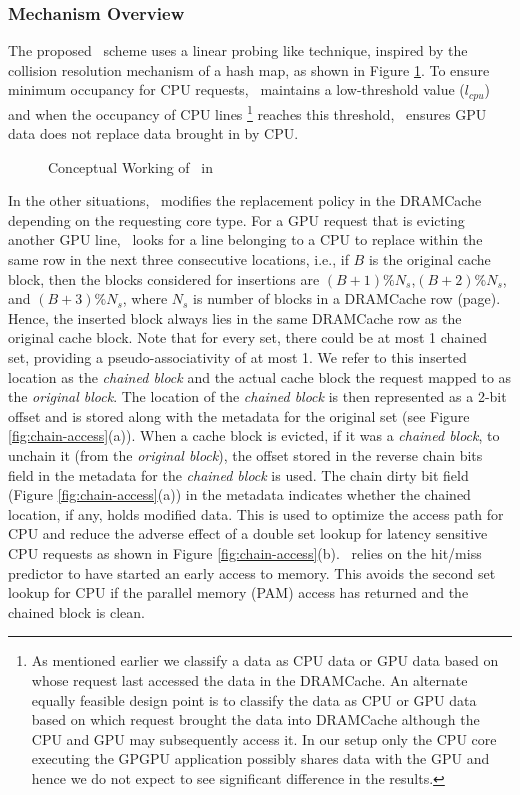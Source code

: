 \subsubsection{Mechanism Overview}
\par The proposed \chaining\ scheme uses a linear probing \cite{knuth-linear-probing} like technique, inspired by the collision resolution mechanism of a hash map, as shown in Figure \ref{fig:chaining-concept}.
To ensure minimum occupancy for CPU requests, \chaining\ maintains a low-threshold value (\textit{$l_{cpu}$}) and when the occupancy of CPU lines
\footnote{As mentioned earlier we classify a data as CPU data or GPU data based on whose request last accessed the data in the DRAMCache. An alternate equally feasible design point is to classify the data as CPU or GPU data based on which request brought the data into DRAMCache although the CPU and GPU may subsequently access it. In our setup only the CPU core executing the GPGPU application possibly shares data with the GPU and hence we do not expect to see significant difference in the results.} 
reaches this threshold, \chaining\ ensures GPU data does not replace data brought in by CPU. 

\begin{figure}
	\centering
	\def\svgwidth{0.45\linewidth}
	
	\caption{Conceptual Working of \chaining\ in \cachename}
	\label{fig:chaining-concept}
\end{figure}

In the other situations, \cachename\ modifies the replacement policy in the DRAMCache depending on the requesting core type. For a GPU request that is evicting another GPU line, \cachename\ looks for a line belonging to a CPU to replace within the same row in the next three consecutive locations,
i.e., if $B$ is the original cache block, then the blocks considered for insertions are $(B+1)\%N_s$,$(B+2)\%N_s$, and $(B+3)\%N_s$, where $N_s$ is number of blocks in a DRAMCache row (page). Hence, the inserted block always lies in the same DRAMCache row as the original cache block. Note that for every set, there could be at most 1 chained set, providing a pseudo-associativity of at most 1.  
We refer to this inserted location as the \textit{chained block} and the actual cache block the request mapped to as the \textit{original block}. The location of the \textit{chained block} is then represented as a 2-bit offset and is stored along with the metadata for the original set (see Figure \ref{fig:chain-access}(a)). When a cache block is evicted, if it was a \textit{chained block}, to unchain it (from the \textit{original block}), the offset stored in the reverse chain bits field in the metadata for the \textit{chained block} is used.  
The chain dirty bit field (Figure \ref{fig:chain-access}(a)) in the metadata indicates whether the chained location, if any, holds modified data. This is used to optimize the access path for CPU and reduce the adverse effect of a double set lookup for latency sensitive CPU requests as shown in Figure \ref{fig:chain-access}(b). \chaining\ relies on the hit/miss predictor to have started an early access to memory. This avoids the second set lookup for CPU if the parallel memory (PAM) access has returned and the chained block is clean. 


